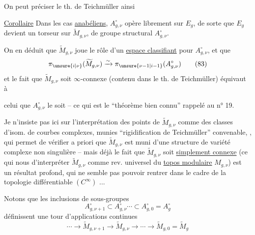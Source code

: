 On peut préciser le th. de Teichmüller ainsi

\uline{Corollaire} Dans les cas \uline{anabéliens}, \(A_{g,\nu}^{\circ}\) opère librement sur \(E_g\), de sorte que \(E_g\) devient un torseur sur \(\widetilde M_{g,\nu}\), de groupe structural \(A_{g,\nu}^{\circ}\).

On en déduit que \(\widetilde M_{g,\nu}\) joue le rôle d'un \uline{espace classifiant} pour \(A_{g,\nu}^{\circ}\), et que
\[
 \pi_{\unsure{i|\nu}}(\widetilde M_{g,\nu})
 \xrightarrow{\sim} \pi_{\unsure{\nu-1|i-1}}(A_{g,\nu}^{\circ})
 \tag{83}
\]
et le fait que \(\widetilde M_{g,\nu}\) soit \(\infty\)-connexe (contenu dans le th. de Teichmüller) équivaut à


celui que \(A_{g,\nu}^{\circ}\) le soit -- ce qui est le ``théorème bien connu'' rappelé au n° 19.

Je n'insiste pas ici sur l'interprétation des points de \(\widetilde M_{g,\nu}\) comme des classes d'isom. de courbes complexes, munies   ``rigidification de Teichmüller'' convenable, , qui permet de vérifier a priori que \(\widetilde M_{g,\nu}\) est muni d'une structure de variété complexe non singulière -- mais déjà le fait que \(\widetilde M_{g,\nu}\) soit \uline{simplement connexe} (ce qui nous  d'interpréter \(\widetilde M_{g,\nu}\) comme rev. universel du \uline{topos modulaire} \(M_{g,\nu}\)) est un résultat profond, qui ne semble pas pouvoir rentrer dans le cadre de la topologie différentiable \((C^\infty)\) ...



Notons que les inclusions de sous-groupes
\[
 A_{g,\nu+1}^{\circ}\subset A_{g,\nu}^{\circ}\cdots\subset A_{g,0}^{\circ}=A_g^{\circ}
\]
définissent une tour d'applications continues
\[
 \cdots\longrightarrow\widetilde M_{g,\nu+1}\longrightarrow\widetilde M_{g,\nu}
 \longrightarrow\cdots\longrightarrow\widetilde M_{g,0}=\widetilde M_g
 \tag{84}
\]

